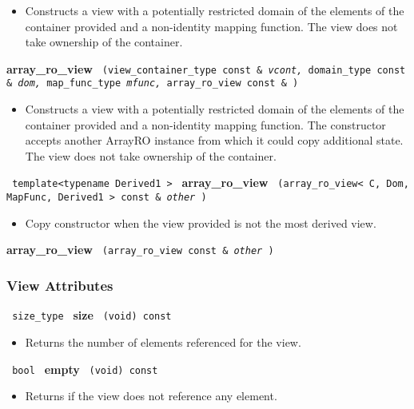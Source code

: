 \begin{itemize}
\item
Constructs a view with a potentially restricted domain of the elements of the container provided and a non-identity mapping function. The view does not take ownership of the container.
\end{itemize}

\noindent
\textbf{array\_ro\_view}%
\texttt{%
(view\_container\_type const \&
\textit{vcont,}%
domain\_type const \&
\textit{dom,}%
map\_func\_type
\textit{mfunc,}%
array\_ro\_view const \&
)
}

\begin{itemize}
\item
Constructs a view with a potentially restricted domain of the elements of the container provided and a non-identity mapping function. The constructor accepts another ArrayRO instance from which it could copy additional state. The view does not take ownership of the container.
\end{itemize}

\noindent
\texttt{%
template<typename Derived1 >
}
\newline
\textbf{array\_ro\_view}%
\texttt{%
(array\_ro\_view< C, Dom, MapFunc, Derived1 > const \&
\textit{other}%
)
}

\begin{itemize}
\item
Copy constructor when the view provided is not the most derived view.
\end{itemize}

\noindent
\textbf{array\_ro\_view}%
\texttt{%
(array\_ro\_view const \&
\textit{other}%
)
}

\subsubsection{ View Attributes}

\noindent
\texttt{%
size\_type
}
\newline
\textbf{size}%
\texttt{%
(void) const
}

\begin{itemize}
\item
Returns the number of elements referenced for the view.
\end{itemize}

\noindent
\texttt{%
bool
}
\newline
\textbf{empty}%
\texttt{%
(void) const
}

\begin{itemize}
\item
Returns if the view does not reference any element.
\end{itemize}


